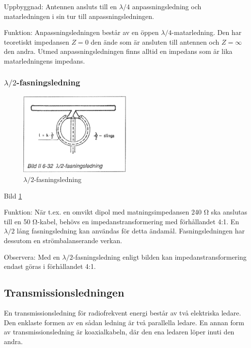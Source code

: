 Uppbyggnad: Antennen ansluts till en \(\lambda/4\) anpassningsledning
och matarledningen i sin tur till anpassningsledningen.

Funktion: Anpassningsledningen består av en öppen
\(\lambda/4\)-matarledning. Den har teoretiskt impedansen \(Z = 0\)
den ände som är ansluten till antennen och \(Z = \infty\) den
andra. Utmed anpassningsledningen finns alltid en impedans som är lika
matarledningens impedans.

\subsubsection{\(\lambda/2\)-fasningsledning}

\begin{figure}
  \includegraphics[width=0.5\textwidth]{images/bild_2_6-32}
  \caption{\(\lambda/2\)-fasningsledning}
  \label{fig:bildII6-32}
\end{figure}

Bild \ref{fig:bildII6-32}

Funktion: När t.ex. en omvikt dipol med matningsimpedansen 240 Ω ska
anslutas till en 50 Ω-kabel, behövs en impedanstransformering med
förhållandet 4:1. En \(\lambda/2\) lång fasningsledning kan användas för detta
ändamål. Fasningsledningen har dessutom en strömbalanserande verkan.

Observera: Med en \(\lambda/2\)-fasningsledning enligt bilden kan
impedanstransformering endast göras i förhållandet 4:1.

\subsection{Transmissionsledningen}

En transmissionsledning för radiofrekvent energi består av två
elektriska ledare.  Den enklaste formen av en sådan ledning är
två parallella ledare. En annan form av transmissionsledning är
koaxialkabeln, där den ena ledaren löper inuti den andra.


